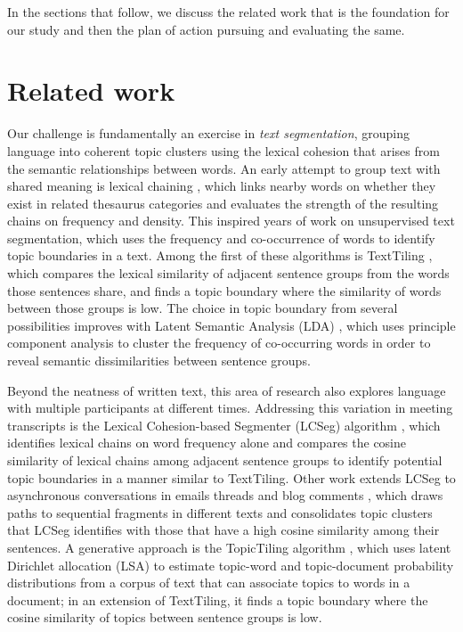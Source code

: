 \documentclass[letterpaper, 12pt]{article}
\begin{document}
In the sections that follow, we discuss the related work that is the foundation for our study and then the plan of action pursuing and evaluating the same.

\section{Related work}

Our challenge is fundamentally an exercise in \textit{text segmentation}, grouping language into coherent topic clusters using the lexical cohesion that arises from the semantic relationships between words. An early attempt to group text with shared meaning is lexical chaining \cite{morris-hirst-1991-lexical}, which links nearby words on whether they exist in related thesaurus categories and evaluates the strength of the resulting chains on frequency and density. This inspired years of work on unsupervised text segmentation, which uses the frequency and co-occurrence of words to identify topic boundaries in a text. Among the first of these algorithms is TextTiling \cite{hearst-1997-texttiling}, which compares the lexical similarity of adjacent sentence groups from the words those sentences share, and finds a topic boundary where the similarity of words between those groups is low. The choice in topic boundary from several possibilities improves with Latent Semantic Analysis (LDA) \cite{choi-etal-2001-latent}, which uses principle component analysis to cluster the frequency of co-occurring words in order to reveal semantic dissimilarities between sentence groups.

Beyond the neatness of written text, this area of research also explores language with multiple participants at different times. Addressing this variation in meeting transcripts is the Lexical Cohesion-based Segmenter (LCSeg) algorithm \cite{galley-etal-2003-discourse}, which identifies lexical chains on word frequency alone and compares the cosine similarity of lexical chains among adjacent sentence groups to identify potential topic boundaries in a manner similar to TextTiling. Other work extends LCSeg to asynchronous conversations in emails threads and blog comments \cite{joty-etal-2013-topic}, which draws paths to sequential fragments in different texts and consolidates topic clusters that LCSeg identifies with those that have a high cosine similarity among their sentences. A generative approach is the TopicTiling algorithm \cite{riedl-biemann-2012-topictiling}, which uses latent Dirichlet allocation (LSA) \cite{blei-etal-2003-latent} to estimate topic-word and topic-document probability distributions from a corpus of text that can associate topics to words in a document; in an extension of TextTiling, it finds a topic boundary where the cosine similarity of topics between sentence groups is low.
\end{document}
